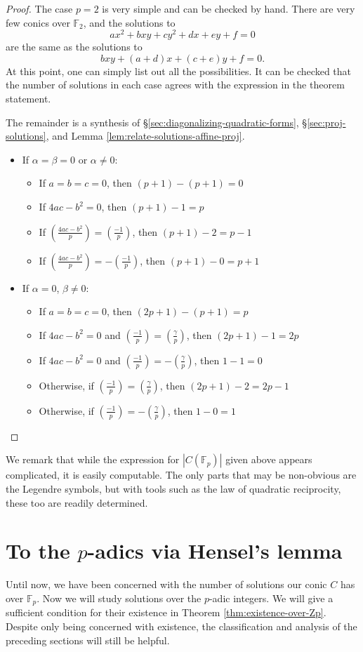 \documentclass[10pt,a4paper]{amsart}
\numberwithin{equation}{section}
\numberwithin{figure}{section}
\theoremstyle{definition}
\theoremstyle{remark}
\theoremstyle{plain}
\theoremstyle{plain}
\theoremstyle{definition}
\theoremstyle{plain}
\theoremstyle{plain}
\newcommand{\legendre}[2]{\genfrac{(}{)}{}{}{#1}{#2}}
\newcommand{\F}{\mathbb{F}}
\begin{document}
	\begin{proof} The case $p=2$ is very simple and can be checked by hand. There are very few conics over $\F_2$, and the solutions to 
		\[ ax^2 + bxy + cy^2 + dx + ey + f = 0 \] 
		are the same as the solutions to 
		\[ bxy + (a+d)x + (c+e)y + f = 0.  \] 
		At this point, one can simply list out all the
		possibilities. It can be checked that the number of solutions in each case agrees with the expression in the theorem statement.
		
		The remainder is a synthesis of \S\ref{sec:diagonalizing-quadratic-forms}, \S\ref{sec:proj-solutions}, and Lemma \ref{lem:relate-solutions-affine-proj}.
	\begin{itemize}
	\item If $\alpha=\beta=0$ or $\alpha\ne 0$:
	\begin{itemize}
	\item If $a=b=c=0$, then $(p+1)-(p+1)=0$
	\item If $4ac-b^2=0$, then $(p+1)-1=p$
	\item If $\legendre{4ac-b^2}{p}=\legendre{-1}{p}$, then $(p+1)-2=p-1$
	\item If $\legendre{4ac-b^2}{p}=-\legendre{-1}{p}$, then $(p+1)-0=p+1$
	\end{itemize}
	\item If $\alpha=0$, $\beta\ne 0$:
	\begin{itemize}
	\item If $a=b=c=0$, then $(2p+1)-(p+1)=p$
	\item If $4ac-b^2=0$ and $\legendre{-1}{p}=\legendre{\gamma}{p}$, then $(2p+1)-1=2p$
	\item If $4ac-b^2=0$ and $\legendre{-1}{p}=-\legendre{\gamma}{p}$, then $1-1=0$
	\item Otherwise, if $\legendre{-1}{p}=\legendre{\gamma}{p}$, then $(2p+1)-2=2p-1$
	\item Otherwise, if $\legendre{-1}{p}=-\legendre{\gamma}{p}$, then $1-0=1$
	\end{itemize}
	\end{itemize}
	\end{proof}

	We remark that while the expression for $|C(\F_p)|$ given above appears complicated, it is easily computable. The only parts that may be non-obvious are the Legendre symbols, but with tools such as the law of quadratic reciprocity, these too are readily determined.

    \section{To the $p$-adics via Hensel's lemma}\label{sec:hensels-lemma}
	Until now, we have been concerned with the number of solutions our conic $C$ has over $\F_p$. Now we will study solutions over the $p$-adic integers. We will give a sufficient condition for their existence in Theorem \ref{thm:existence-over-Zp}. Despite only being concerned with existence, the classification and analysis of the preceding sections will still be helpful.
	
\end{document}
